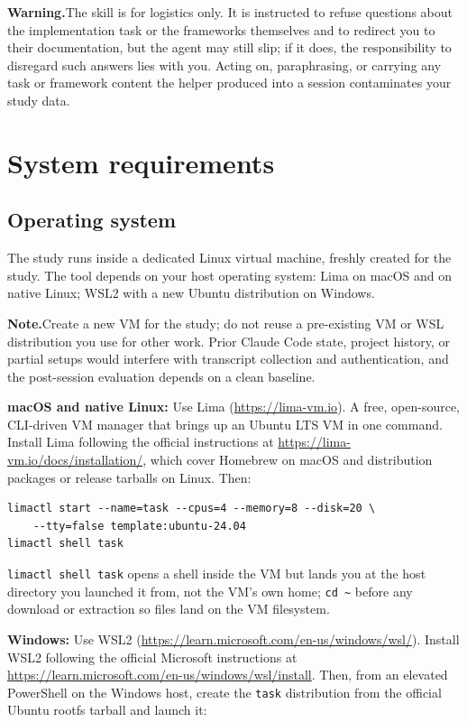 \documentclass[11pt, a4paper]{article}
\newcommand{\note}[1]{%
    \begin{mdframed}[linecolor=noteborder]
    \textbf{\textcolor{noteborder}{Note.}}\enspace #1
    \end{mdframed}%
}
\newcommand{\warn}[1]{%
    \begin{mdframed}[linecolor=warnborder]
    \textbf{\textcolor{warnborder}{Warning.}}\enspace #1
    \end{mdframed}%
}
\begin{document}
\warn{The skill is for logistics only. It is instructed to refuse questions about the implementation task or the frameworks themselves and to redirect you to their documentation, but the agent may still slip; if it does, the responsibility to disregard such answers lies with you. Acting on, paraphrasing, or carrying any task or framework content the helper produced into a session contaminates your study data.}

\section{System requirements}
\label{sec:requirements}

\subsection{Operating system}
\label{sec:os}

The study runs inside a dedicated Linux virtual machine, freshly created for the study. The tool depends on your host operating system: Lima on macOS and on native Linux; WSL2 with a new Ubuntu distribution on Windows.

\note{Create a new VM for the study; do not reuse a pre-existing VM or WSL distribution you use for other work. Prior Claude Code state, project history, or partial setups would interfere with transcript collection and authentication, and the post-session evaluation depends on a clean baseline.}

\textbf{macOS and native Linux:} Use Lima (\url{https://lima-vm.io}). A free, open-source, CLI-driven VM manager that brings up an Ubuntu LTS VM in one command. Install Lima following the official instructions at \url{https://lima-vm.io/docs/installation/}, which cover Homebrew on macOS and distribution packages or release tarballs on Linux. Then:

\begin{verbatim}
limactl start --name=task --cpus=4 --memory=8 --disk=20 \
    --tty=false template:ubuntu-24.04
limactl shell task
\end{verbatim}

\texttt{limactl shell task} opens a shell inside the VM but lands you at the host directory you launched it from, not the VM's own home; \texttt{cd \textasciitilde} before any download or extraction so files land on the VM filesystem.

\textbf{Windows:} Use WSL2 (\url{https://learn.microsoft.com/en-us/windows/wsl/}). Install WSL2 following the official Microsoft instructions at \url{https://learn.microsoft.com/en-us/windows/wsl/install}. Then, from an elevated PowerShell on the Windows host, create the \texttt{task} distribution from the official Ubuntu rootfs tarball and launch it:
\end{document}
